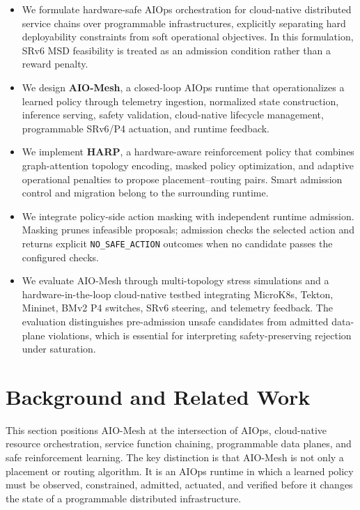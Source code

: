 \documentclass[final,5p]{elsarticle}
\newcommand{\rev}[1]{\textcolor{revisiongreen}{#1}}
\let\newrev\rev
\begin{document}
\begin{itemize}
    \item We formulate hardware-safe AIOps orchestration for cloud-native distributed service chains over programmable infrastructures, explicitly separating hard deployability constraints from soft operational objectives. In this formulation, SRv6 MSD feasibility is treated as an admission condition rather than a reward penalty.

    \item We design \textbf{AIO-Mesh}, a closed-loop AIOps runtime that operationalizes a learned policy through telemetry ingestion, normalized state construction, inference serving, safety validation, cloud-native lifecycle management, programmable SRv6/P4 actuation, and runtime feedback.

    \item We \newrev{implement} \textbf{HARP}, a hardware-aware reinforcement policy that combines graph-attention topology encoding, masked policy optimization, \newrev{and} adaptive operational penalties \newrev{to propose placement--routing pairs. Smart admission control and migration belong to the surrounding runtime}.

    \item We \newrev{integrate policy-side action masking with independent runtime admission. Masking prunes infeasible proposals; admission checks the selected action and returns explicit} \texttt{NO\_SAFE\_ACTION} outcomes when \newrev{no candidate passes the configured checks}.

    \item We evaluate AIO-Mesh through multi-topology stress simulations and a hardware-in-the-loop cloud-native testbed integrating MicroK8s, Tekton, Mininet, BMv2 P4 switches, SRv6 steering, and telemetry feedback. The evaluation distinguishes pre-admission unsafe candidates from admitted data-plane violations, which is essential for interpreting safety-preserving rejection under saturation.
\end{itemize}

\section{Background and Related Work}
\label{sec:related}

This section positions AIO-Mesh at the intersection of AIOps, cloud-native resource orchestration, service function chaining, programmable data planes, and safe reinforcement learning. The key distinction is that AIO-Mesh is not only a placement or routing algorithm. It is an AIOps runtime in which a learned policy must be observed, constrained, admitted, actuated, and verified before it changes the state of a programmable distributed infrastructure.
\end{document}
